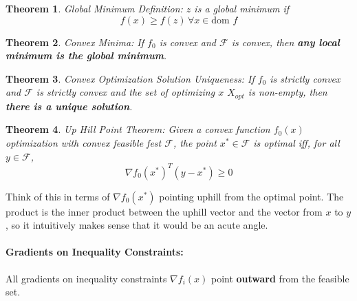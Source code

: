 \documentclass[a4paper,12pt]{report}
\newtheorem{theorem}{Theorem}
\begin{document}
\begin{theorem}{Global Minimum Definition: }
$z$ is a global minimum if 
\begin{equation}
f(x) \geq f(z) \, \forall x\in \text{dom }f
\end{equation}
\end{theorem}

\begin{theorem}{Convex Minima: }
If $f_0$ is convex and $\mathcal F$ is convex, then \textbf{any local minimum is the global minimum}.
\end{theorem}


\begin{theorem}{Convex Optimization Solution Uniqueness: }
If $f_0$ is strictly convex and $\mathcal F$ is strictly convex and the set of optimizing $x$ $X_{opt}$ is non-empty, then \textbf{there is a unique solution}.
\end{theorem}


\begin{theorem}{Up Hill Point Theorem: }
Given a convex function $f_0(x)$ optimization with convex feasible fest $\mathcal F$, the point $x^*\in \mathcal F$ is optimal iff, for all $y\in \mathcal F$, 
\begin{equation}
\nabla f_0(x^*)^T (y-x^*) \geq 0
\end{equation}
\end{theorem}
Think of this in terms of $\nabla f_0(x^*)$ pointing uphill from the optimal point. The product is the inner product between the uphill vector and the vector from $x$ to $y$, so it intuitively makes sense that it would be an acute angle. 

\paragraph{Gradients on Inequality Constraints: } All gradients on inequality constraints $\nabla f_i(x)$ point \textbf{outward} from the feasible set. 
\end{document}
